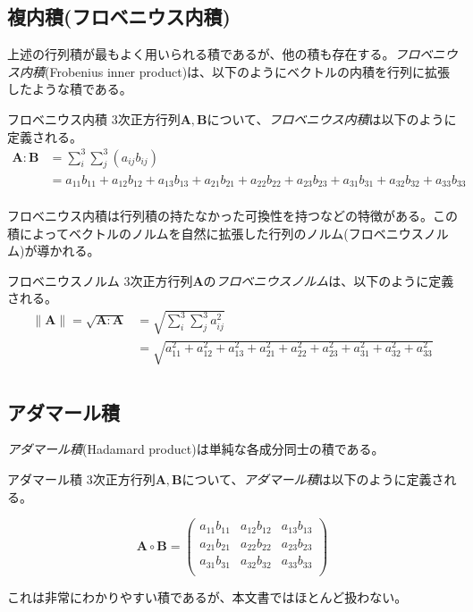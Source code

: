\subsection{複内積(フロベニウス内積)}
上述の行列積が最もよく用いられる積であるが、他の積も存在する。\emph{フロベニウス内積}(Frobenius inner product)は、以下のようにベクトルの内積を行列に拡張したような積である。
\begin{definition*}{フロベニウス内積}
	3次正方行列\(\boldsymbol{A},\boldsymbol{B}\)について、\emph{フロベニウス内積}は以下のように定義される。
	\begin{equation}
		\begin{aligned}
			\boldsymbol{A} : \boldsymbol{B} & =\sum^3_i\sum^3_j (a_{ij}b_{ij}) \\&=
			a_{11}b_{11} + a_{12}b_{12} + a_{13}b_{13} +
			a_{21}b_{21} + a_{22}b_{22} + a_{23}b_{23} +
			a_{31}b_{31} + a_{32}b_{32} + a_{33}b_{33}                         \\
		\end{aligned}
	\end{equation}
\end{definition*}
フロベニウス内積は行列積の持たなかった可換性を持つなどの特徴がある。この積によってベクトルのノルムを自然に拡張した行列のノルム(フロベニウスノルム)が導かれる。
\begin{definition*}{フロベニウスノルム}
	3次正方行列\(\boldsymbol{A}\)の\emph{フロベニウスノルム}は、以下のように定義される。
	\begin{equation}
		\begin{aligned}
			\|\boldsymbol{A}\|=\sqrt{\boldsymbol{A} : \boldsymbol{A}} & =\sqrt{\sum^3_i\sum^3_j a_{ij}^2} \\&=
			\sqrt{a_{11}^2 + a_{12}^2 + a_{13}^2 +
				a_{21}^2 + a_{22}^2 + a_{23}^2 +
			a_{31}^2 + a_{32}^2 + a_{33}^2}                                                               \\
		\end{aligned}
	\end{equation}
\end{definition*}
\subsection{アダマール積}
\emph{アダマール積}(Hadamard product)は単純な各成分同士の積である。
\begin{definition*}{アダマール積}
	3次正方行列\(\boldsymbol{A},\boldsymbol{B}\)について、\emph{アダマール積}は以下のように定義される。

	\begin{equation}
		\boldsymbol{A}\circ\boldsymbol{B}=
		\begin{pmatrix}
			a_{11}b_{11} & a_{12}b_{12} & a_{13}b_{13} \\
			a_{21}b_{21} & a_{22}b_{22} & a_{23}b_{23} \\
			a_{31}b_{31} & a_{32}b_{32} & a_{33}b_{33} \\
		\end{pmatrix}
	\end{equation}
\end{definition*}
これは非常にわかりやすい積であるが、本文書ではほとんど扱わない。
